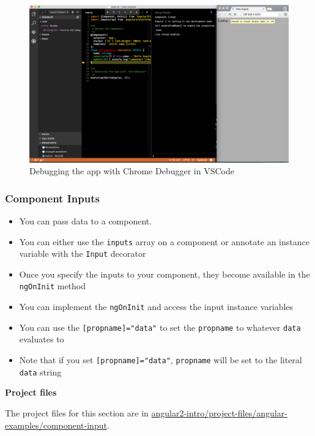 \documentclass[12pt,]{article}
\providecommand{\tightlist}{%
  \setlength{\itemsep}{0pt}\setlength{\parskip}{0pt}}
\begin{document}
\begin{figure}[htbp]
\centering
\includegraphics{images/run-debugger.png}
\caption{Debugging the app with Chrome Debugger in VSCode}
\end{figure}

\subsubsection{Component Inputs}\label{component-inputs}

\begin{itemize}
\tightlist
\item
  You can pass data to a component.
\item
  You can either use the \texttt{inputs} array on a component or
  annotate an instance variable with the \texttt{Input} decorator
\item
  Once you specify the inputs to your component, they become available
  in the \texttt{ngOnInit} method
\item
  You can implement the \texttt{ngOnInit} and access the input instance
  variables
\item
  You can use the \texttt{{[}propname{]}="data"} to set the
  \texttt{propname} to whatever \texttt{data} evaluates to
\item
  Note that if you set
  \texttt{{[}propname{]}="\textquotesingle{}data\textquotesingle{}"},
  \texttt{propname} will be set to the literal \texttt{data} string
\end{itemize}

\textbf{Project files}

The project files for this section are in
\href{https://github.com/aminmeyghani/angular2-intro/tree/master/project-files/angular-examples/component-input}{angular2-intro/project-files/angular-examples/component-input}.
\end{document}

